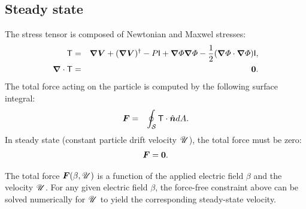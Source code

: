 \subsection{Steady state}
The stress tensor is composed of Newtonian and Maxwel stresses:
\begin{eqnarray}
\mathsf{T} &=& \boldsymbol{\nabla} \boldsymbol{V} + (\boldsymbol{\nabla} \boldsymbol{V})^\dagger - P \mathsf{I}
+ \boldsymbol{\nabla} \varPhi \boldsymbol{\nabla} \varPhi - \frac{1}{2} (\boldsymbol{\nabla} \varPhi \cdot \boldsymbol{\nabla} \varPhi) \mathsf{I}, \\
\boldsymbol{\nabla} \cdot \mathsf{T} &=& \boldsymbol{0}.
\end{eqnarray}
The total force acting on the particle is computed by the following surface integral:
\begin{eqnarray}
\boldsymbol{F} &=& \oint_\mathcal{S} \mathsf{T} \cdot \hat{\boldsymbol{n}} dA.
\end{eqnarray}
In steady state (constant particle drift velocity $\mathscr{U}$), 
the total force must be zero: 
\begin{eqnarray}
\boldsymbol{F} = \boldsymbol{0}.
\end{eqnarray}

The total force $\boldsymbol{F}(\beta, \mathscr{U})$ is a function of the applied electric field $\beta$ and
the velocity $\mathscr{U}$.
For any given electric field $\beta$, the force-free constraint above 
can be solved numerically for $\mathscr{U}$ to
yield the corresponding steady-state velocity.
